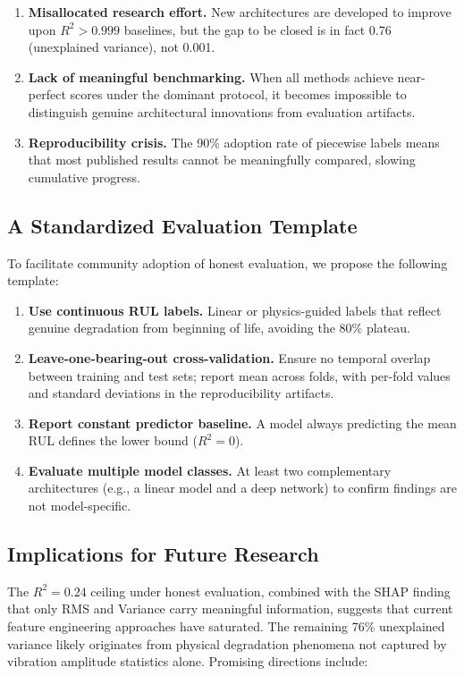 \documentclass[5p,twocolumn]{elsarticle}
\begin{document}
\begin{enumerate}
    \item \textbf{Misallocated research effort.} New architectures are developed to improve upon $R^2 > 0.999$ baselines, but the gap to be closed is in fact 0.76 (unexplained variance), not 0.001.
    \item \textbf{Lack of meaningful benchmarking.} When all methods achieve near-perfect scores under the dominant protocol, it becomes impossible to distinguish genuine architectural innovations from evaluation artifacts.
    \item \textbf{Reproducibility crisis.} The 90\% adoption rate of piecewise labels means that most published results cannot be meaningfully compared, slowing cumulative progress.
\end{enumerate}

\subsection{A Standardized Evaluation Template}

To facilitate community adoption of honest evaluation, we propose the following template:

\begin{enumerate}
    \item \textbf{Use continuous RUL labels.} Linear or physics-guided labels that reflect genuine degradation from beginning of life, avoiding the 80\% plateau.
    \item \textbf{Leave-one-bearing-out cross-validation.} Ensure no temporal overlap between training and test sets; report mean across folds, with per-fold values and standard deviations in the reproducibility artifacts.
    \item \textbf{Report constant predictor baseline.} A model always predicting the mean RUL defines the lower bound ($R^2 = 0$).
    \item \textbf{Evaluate multiple model classes.} At least two complementary architectures (e.g., a linear model and a deep network) to confirm findings are not model-specific.
\end{enumerate}

\subsection{Implications for Future Research}

The $R^2 = 0.24$ ceiling under honest evaluation, combined with the SHAP finding that only RMS and Variance carry meaningful information, suggests that current feature engineering approaches have saturated. The remaining 76\% unexplained variance likely originates from physical degradation phenomena not captured by vibration amplitude statistics alone. Promising directions include:
\end{document}
